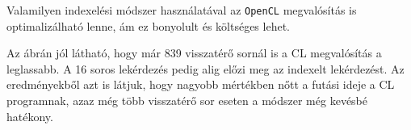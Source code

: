 Valamilyen indexelési módszer használatával az \texttt{OpenCL} megvalósítás is optimalizálható lenne, ám ez bonyolult és költséges lehet.

Az ábrán jól látható, hogy már 839 visszatérő sornál is a CL megvalósítás a leglassabb. A 16 soros lekérdezés pedig alig előzi meg az indexelt lekérdezést.
Az eredményekből azt is látjuk, hogy nagyobb mértékben nőtt a futási ideje a CL programnak, azaz még több visszatérő sor eseten a módszer még kevésbé hatékony.







